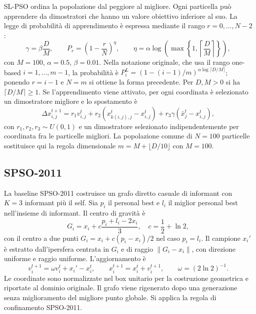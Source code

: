 SL-PSO ordina la popolazione dal peggiore al migliore. Ogni particella può apprendere da dimostratori che hanno un valore obiettivo inferiore al suo. La legge di probabilità di apprendimento \citep{ChengJin2015SLPSO} è espressa mediante il rango $r=0,\ldots,N-2$:
\begin{equation}
 \gamma=\beta\frac{D}{M},\qquad
 P_r=\left(1-\frac{r}{N}\right)^\eta,
 \qquad \eta=\alpha\log\!\left(\max\left\{1,\left\lceil\frac{D}{M}\right\rceil\right\}\right),
 \label{eq:app-slpso-impl}
\end{equation}
con $M=100$, $\alpha=0.5$, $\beta=0.01$. Nella notazione originale, che usa il rango one-based $i=1,\ldots,m-1$, la probabilità è $P_i^L=(1-(i-1)/m)^{\alpha\log\lceil D/M\rceil}$; ponendo $r=i-1$ e $N=m$ si ottiene la forma precedente. Per $D,M>0$ si ha $\lceil D/M\rceil\geq1$. Se l'apprendimento viene attivato, per ogni coordinata è selezionato un dimostratore migliore e lo spostamento è
\begin{equation}
 \Delta x_{i,j}^{t+1}=r_1v_{i,j}^t
 +r_2(x_{k(i,j),j}^t-x_{i,j}^t)
 +r_3\gamma(\bar x_j^t-x_{i,j}^t),
 \label{eq:app-slpso-update}
\end{equation}
con $r_1,r_2,r_3\sim U(0,1)$ e un dimostratore selezionato indipendentemente per coordinata fra le particelle migliori. La popolazione comune di $N=100$ particelle sostituisce qui la regola dimensionale $m=M+\lfloor D/10\rfloor$ con $M=100$.
\subsection{SPSO-2011}

La baseline SPSO-2011 costruisce un grafo diretto casuale di informant con $K=3$ informant più il self. Sia $p_i$ il personal best e $l_i$ il miglior personal best nell'insieme di informant. Il centro di gravità è
\begin{equation}
 G_i=x_i+c\frac{p_i+l_i-2x_i}{3},
 \quad c=\frac12+\ln2,
 \label{eq:app-spso-center}
\end{equation}
con il centro a due punti $G_i=x_i+c(p_i-x_i)/2$ nel caso $p_i=l_i$. Il campione $x_i'$ è estratto dall'ipersfera centrata in $G_i$ e di raggio $\|G_i-x_i\|$, con direzione uniforme e raggio uniforme. L'aggiornamento è
\begin{equation}
 v_i^{t+1}=\omega v_i^t+x_i'-x_i^t,
 \qquad x_i^{t+1}=x_i^t+v_i^{t+1},
 \qquad \omega=(2\ln2)^{-1}.
 \label{eq:app-spso-update}
\end{equation}
Le coordinate sono normalizzate nel box unitario per la costruzione geometrica e riportate al dominio originale. Il grafo viene rigenerato dopo una generazione senza miglioramento del migliore punto globale. Si applica la regola di confinamento SPSO-2011.

